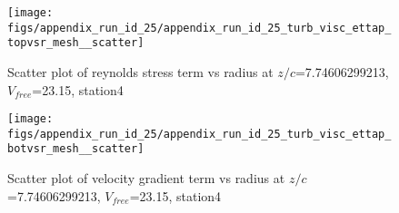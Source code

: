 \begin{figure}[H]
\centering
\texttt{[image: figs/appendix\_run\_id\_25/appendix\_run\_id\_25\_turb\_visc\_ettap\_topvsr\_mesh\_\_scatter]}
\caption{Scatter plot of reynolds stress term vs radius at $z/c$=7.74606299213, $V_{free}$=23.15, station4}
\label{fig:appendix_run_id_25_turb_visc_ettap_topvsr_mesh__scatter}
\end{figure}


\begin{figure}[H]
\centering
\texttt{[image: figs/appendix\_run\_id\_25/appendix\_run\_id\_25\_turb\_visc\_ettap\_botvsr\_mesh\_\_scatter]}
\caption{Scatter plot of velocity gradient term vs radius at $z/c$=7.74606299213, $V_{free}$=23.15, station4}
\label{fig:appendix_run_id_25_turb_visc_ettap_botvsr_mesh__scatter}
\end{figure}


